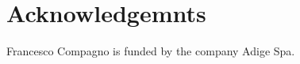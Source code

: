 \documentclass[sw]{iosart2x}
\begin{document}

\section*{Acknowledgemnts}


Francesco Compagno is funded
by the company Adige Spa.





%
\end{document}

